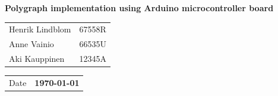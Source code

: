 \documentclass[a4paper,11pt]{article}
\begin{document}
\begin{titlepage}
\pagestyle{empty}
\begin{center}

\vspace*{3cm}
\noindent\LARGE{\textbf{
%
Polygraph implementation using Arduino microcontroller board
%
}}
\\
\vspace*{1cm}
\large{
\begin{tabular}{l l}
%
Henrik Lindblom & 67558R \\
Anne Vainio & 66535U \\
Aki Kauppinen & 12345A
%
\end{tabular}

\vspace*{1cm}
\begin{tabular}{l l}
Date & \textbf{
%
\today 
%
}
\end{tabular}
}
\end{center}
\end{titlepage}
\tableofcontents
\newpage
{}
\end{document}
